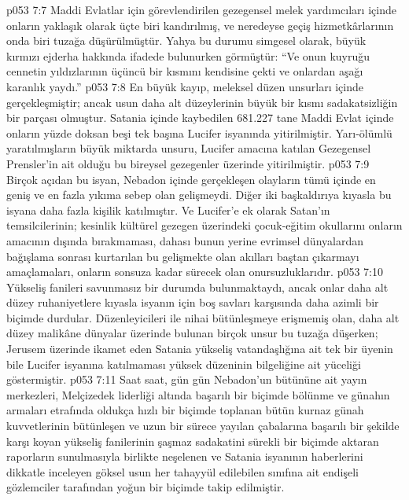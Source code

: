 \vs p053 7:7 Maddi Evlatlar için görevlendirilen gezegensel melek yardımcıları içinde onların yaklaşık olarak üçte biri kandırılmış, ve neredeyse geçiş hizmetkârlarının onda biri tuzağa düşürülmüştür. Yahya bu durumu simgesel olarak, büyük kırmızı ejderha hakkında ifadede bulunurken görmüştür: “Ve onun kuyruğu cennetin yıldızlarının üçüncü bir kısmını kendisine çekti ve onlardan aşağı karanlık yaydı.”
\vs p053 7:8 En büyük kayıp, meleksel düzen unsurları içinde gerçekleşmiştir; ancak usun daha alt düzeylerinin büyük bir kısmı sadakatsizliğin bir parçası olmuştur. Satania içinde kaybedilen 681.227 tane Maddi Evlat içinde onların yüzde doksan beşi tek başına Lucifer isyanında yitirilmiştir. Yarı\hyp{}ölümlü yaratılmışların büyük miktarda unsuru, Lucifer amacına katılan Gezegensel Prensler’in ait olduğu bu bireysel gezegenler üzerinde yitirilmiştir.
\vs p053 7:9 Birçok açıdan bu isyan, Nebadon içinde gerçekleşen olayların tümü içinde en geniş ve en fazla yıkıma sebep olan gelişmeydi. Diğer iki başkaldırıya kıyasla bu isyana daha fazla kişilik katılmıştır. Ve Lucifer’e ek olarak Satan’ın temsilcilerinin; kesinlik kültürel gezegen üzerindeki çocuk\hyp{}eğitim okullarını onların amacının dışında bırakmaması, dahası bunun yerine evrimsel dünyalardan bağışlama sonrası kurtarılan bu gelişmekte olan akılları baştan çıkarmayı amaçlamaları, onların sonsuza kadar sürecek olan onursuzluklarıdır.
\vs p053 7:10 Yükseliş fanileri savunmasız bir durumda bulunmaktaydı, ancak onlar daha alt düzey ruhaniyetlere kıyasla isyanın için boş savları karşısında daha azimli bir biçimde durdular. Düzenleyicileri ile nihai bütünleşmeye erişmemiş olan, daha alt düzey malikâne dünyalar üzerinde bulunan birçok unsur bu tuzağa düşerken; Jerusem üzerinde ikamet eden Satania yükseliş vatandaşlığına ait tek bir üyenin bile Lucifer isyanına katılmaması yüksek düzeninin bilgeliğine ait yüceliği göstermiştir.
\vs p053 7:11 Saat saat, gün gün Nebadon’un bütününe ait yayın merkezleri, Melçizedek liderliği altında başarılı bir biçimde bölünme ve günahın armaları etrafında oldukça hızlı bir biçimde toplanan bütün kurnaz günah kuvvetlerinin bütünleşen ve uzun bir sürece yayılan çabalarına başarılı bir şekilde karşı koyan yükseliş fanilerinin şaşmaz sadakatini sürekli bir biçimde aktaran raporların sunulmasıyla birlikte neşelenen ve Satania isyanının haberlerini dikkatle inceleyen göksel usun her tahayyül edilebilen sınıfına ait endişeli gözlemciler tarafından yoğun bir biçimde takip edilmiştir.
